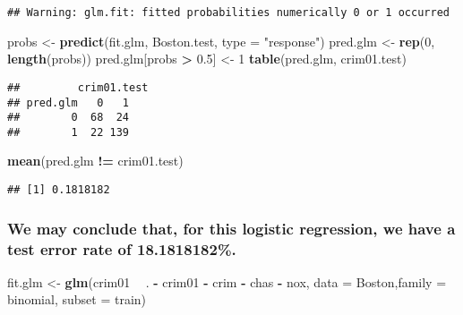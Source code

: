 \documentclass[]{article}
\newenvironment{Shaded}{\begin{snugshade}}{\end{snugshade}}
\newcommand{\KeywordTok}[1]{\textcolor[rgb]{0.13,0.29,0.53}{\textbf{#1}}}
\newcommand{\DataTypeTok}[1]{\textcolor[rgb]{0.13,0.29,0.53}{#1}}
\newcommand{\DecValTok}[1]{\textcolor[rgb]{0.00,0.00,0.81}{#1}}
\newcommand{\FloatTok}[1]{\textcolor[rgb]{0.00,0.00,0.81}{#1}}
\newcommand{\StringTok}[1]{\textcolor[rgb]{0.31,0.60,0.02}{#1}}
\newcommand{\OperatorTok}[1]{\textcolor[rgb]{0.81,0.36,0.00}{\textbf{#1}}}
\newcommand{\NormalTok}[1]{#1}
\begin{document}
\begin{verbatim}
## Warning: glm.fit: fitted probabilities numerically 0 or 1 occurred
\end{verbatim}

\begin{Shaded}
\begin{Highlighting}[]
\NormalTok{probs <-}\StringTok{ }\KeywordTok{predict}\NormalTok{(fit.glm, Boston.test, }\DataTypeTok{type =} \StringTok{"response"}\NormalTok{)}
\NormalTok{pred.glm <-}\StringTok{ }\KeywordTok{rep}\NormalTok{(}\DecValTok{0}\NormalTok{, }\KeywordTok{length}\NormalTok{(probs))}
\NormalTok{pred.glm[probs }\OperatorTok{>}\StringTok{ }\FloatTok{0.5}\NormalTok{] <-}\StringTok{ }\DecValTok{1}
\KeywordTok{table}\NormalTok{(pred.glm, crim01.test)}
\end{Highlighting}
\end{Shaded}

\begin{verbatim}
##         crim01.test
## pred.glm   0   1
##        0  68  24
##        1  22 139
\end{verbatim}

\begin{Shaded}
\begin{Highlighting}[]
\KeywordTok{mean}\NormalTok{(pred.glm }\OperatorTok{!=}\StringTok{ }\NormalTok{crim01.test)}
\end{Highlighting}
\end{Shaded}

\begin{verbatim}
## [1] 0.1818182
\end{verbatim}

\subsubsection{We may conclude that, for this logistic regression, we
have a test error rate of
18.1818182\%.}\label{we-may-conclude-that-for-this-logistic-regression-we-have-a-test-error-rate-of-18.1818182.}

\begin{Shaded}
\begin{Highlighting}[]
\NormalTok{fit.glm <-}\StringTok{ }\KeywordTok{glm}\NormalTok{(crim01 }\OperatorTok{~}\StringTok{ }\NormalTok{. }\OperatorTok{-}\StringTok{ }\NormalTok{crim01 }\OperatorTok{-}\StringTok{ }\NormalTok{crim }\OperatorTok{-}\StringTok{ }\NormalTok{chas }\OperatorTok{-}\StringTok{ }\NormalTok{nox, }\DataTypeTok{data =}\NormalTok{ Boston,}\DataTypeTok{family =}\NormalTok{ binomial, }\DataTypeTok{subset =}\NormalTok{ train)}
\end{Highlighting}
\end{Shaded}
\end{document}
